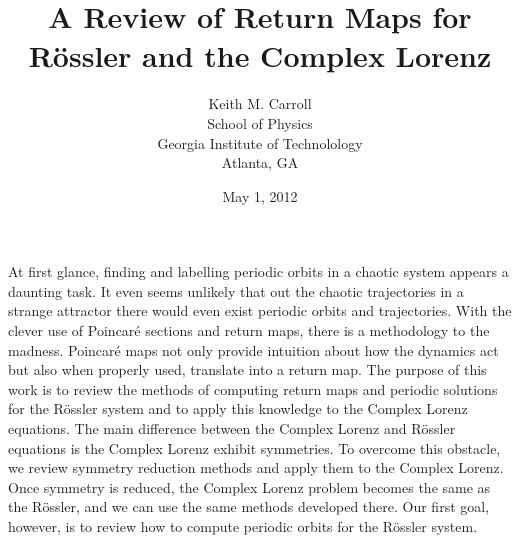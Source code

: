 \documentclass[12 pt]{article}
\begin{document}
\title{A Review of Return Maps for R\"ossler and the Complex Lorenz}
\author{Keith M. Carroll\\ School of Physics \\ Georgia Institute of Technolology \\ Atlanta, GA}
\date{May 1, 2012}
\maketitle
At first glance, finding and labelling periodic orbits in a chaotic system appears a daunting task.  It even seems unlikely that out the chaotic trajectories in a strange attractor there would even exist periodic orbits and trajectories.  With the clever use of Poincar\'e sections and return maps, there is a methodology to the madness.  Poincar\'e maps not only provide intuition about how the dynamics act but also when properly used, translate into a return map.  The purpose of this work is to review the methods of computing return maps and periodic solutions for the R\"ossler system and to apply this knowledge to the Complex Lorenz equations.  The main difference between the Complex Lorenz and R\"ossler equations is the Complex Lorenz exhibit symmetries.  To overcome this obstacle, we review symmetry reduction methods and apply them to the Complex Lorenz.  Once symmetry is reduced, the Complex Lorenz problem becomes the same as the R\"ossler, and we can use the same methods developed there.  Our first goal, however, is to review how to compute periodic orbits for the R\"ossler system.
\end{document}
